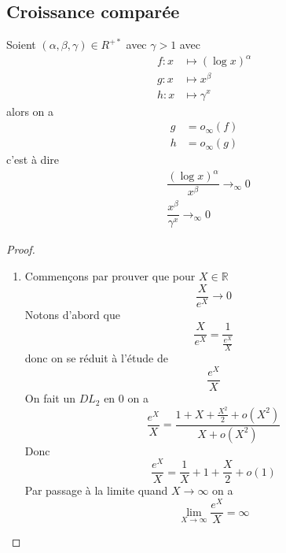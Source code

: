 \documentclass[11pt,colorlinks]{book}
\theoremstyle{mytheoremstyle}
\theoremstyle{mytheoremstyle}
\theoremstyle{mytheoremstyle}
\theoremstyle{mytheoremstyle}
\theoremstyle{mytheoremstyle}
\theoremstyle{mytheoremstyle}
\theoremstyle{mytheoremstyle}
\theoremstyle{mytheoremstyle}
\theoremstyle{myproblemstyle}
\def\mbb#1{\mathbb{#1}}
\def\bR{\mbb{R}}
\begin{document}
    \subsection{Croissance comparée}
    \begin{theorem}
      Soient $(\alpha,\beta,\gamma) \in R^{+*}$ avec $\gamma > 1$ avec 
      \begin{align*}
        f : x &\mapsto (\log x)^{\alpha} \\ 
        g : x &\mapsto x^{\beta} \\ 
        h : x &\mapsto \gamma^{x}
      \end{align*} 
      alors on a 
      \begin{align*}
        g &= o_{\infty}(f) \\ 
        h &= o_{\infty}(g)
      \end{align*}
      c'est à dire 
      \begin{align*}
        &\dfrac{(\log x)^\alpha}{x^\beta} \to_{\infty} 0 \\ 
        &\dfrac{x^{\beta}}{\gamma^x} \to_{\infty} 0
      \end{align*}
      \begin{proof}
        \begin{enumerate}
          \item Commençons par prouver que pour $X \in \bR$
          \begin{equation*}
            \frac{X}{e^X} \to 0
          \end{equation*}
          Notons d'abord que 
          \begin{equation*}
            \frac{X}{e^X} = \frac{1}{\frac{e^X}{X}}
          \end{equation*}
          donc on se réduit à l'étude de
          \begin{equation*}
            \frac{e^X}{X}
          \end{equation*}
          On fait un $DL_2$ en 0 on a 
          \begin{equation*}
            \frac{e^X}{X} = \frac{1+X+\frac{X^2}{2}+o(X^2)}{X+o(X^2)}
          \end{equation*}
          Donc 
          \begin{equation*}
            \frac{e^X}{X} = \frac{1}{X} + 1 + \frac{X}{2} + o(1)
          \end{equation*}
          Par passage à la limite quand $X \to \infty$ on a 
          \begin{equation*}
            \lim_{X\to \infty} \frac{e^X}{X} = \infty  

\end{equation*}
\end{enumerate}
\end{proof}
\end{theorem}
\end{document}
